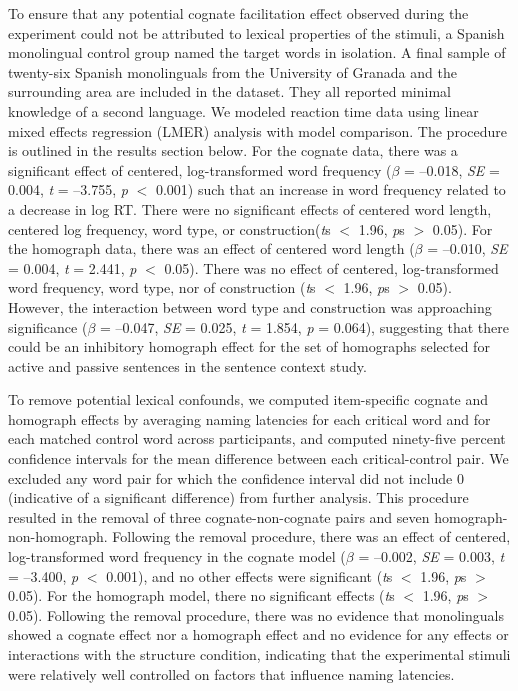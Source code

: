 To ensure that any potential cognate facilitation effect observed during the experiment could not be attributed to lexical properties of the stimuli, a Spanish monolingual control group named the target words in isolation. A final sample of twenty-six Spanish monolinguals from the University of Granada and the surrounding area are included in the dataset. They all reported minimal knowledge of a second language. We modeled reaction time data using linear mixed effects regression (LMER) analysis with model comparison. The procedure is outlined in the results section below. For the cognate data, there was a significant effect of centered, log-transformed word frequency (\emph{$\beta$} = --0.018, \emph{SE} = 0.004, \emph{t} = --3.755, \emph{p} $<$ 0.001) such that an increase in word frequency related to a decrease in log RT. There were no significant effects of centered word length, centered log frequency, word type, or construction(\emph{t}s $<$ 1.96, \emph{p}s $>$ 0.05). For the homograph data, there was an effect of centered word length (\emph{$\beta$} = --0.010, \emph{SE} = 0.004, \emph{t} = 2.441, \emph{p} $<$ 0.05). There was no effect of centered, log-transformed word frequency, word type, nor of construction (\emph{t}s $<$ 1.96, \emph{p}s $>$ 0.05). However, the interaction between word type and construction was approaching significance (\emph{$\beta$} = --0.047, \emph{SE} = 0.025, \emph{t} = 1.854, \emph{p} = 0.064), suggesting that there could be an inhibitory homograph effect for the set of homographs selected for active and passive sentences in the sentence context study. 


To remove potential lexical confounds, we computed item-specific cognate and homograph effects by averaging naming latencies for each critical word and for each matched control word across participants, and computed ninety-five percent confidence intervals for the mean difference between each critical-control pair. We excluded any word pair for which the confidence interval did not include 0 (indicative of a significant difference) from further analysis. This procedure resulted in the removal of three cognate-non-cognate pairs and seven homograph-non-homograph. Following the removal procedure, there was an effect of centered, log-transformed word frequency in the cognate model (\emph{$\beta$} = --0.002, \emph{SE} = 0.003, \emph{t} = --3.400, \emph{p} $<$ 0.001), and no other effects were significant (\emph{t}s $<$ 1.96, \emph{p}s $>$ 0.05). For the homograph model, there no significant effects (\emph{t}s $<$ 1.96, \emph{p}s $>$ 0.05). Following the removal procedure, there was no evidence that monolinguals showed a cognate effect nor a homograph effect and no evidence for any effects or interactions with the structure condition, indicating that the experimental stimuli were relatively well controlled on factors that influence naming latencies.

